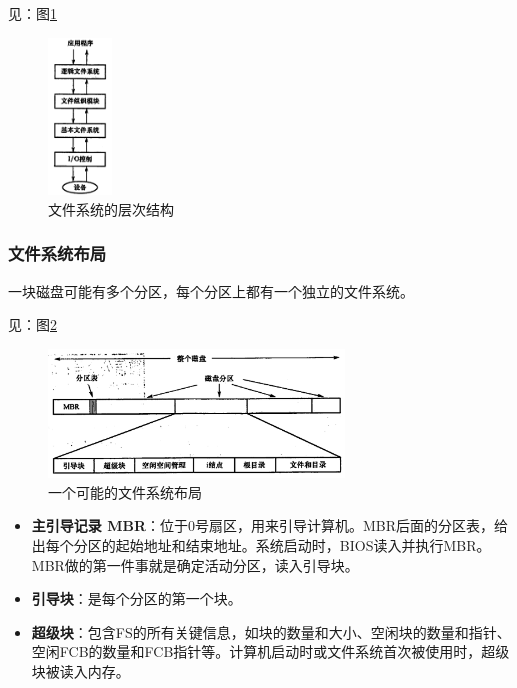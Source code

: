 \documentclass[12pt, a4paper, oneside]{ctexart}
\begin{document}
见：图\ref{fs-layer}

\begin{figure}[h]
  \centering
  \includegraphics[width=0.15\textwidth]{./images/fs-layer.png}
  \caption{文件系统的层次结构}
  \label{fs-layer}
\end{figure}

\subsubsection{文件系统布局}

一块磁盘可能有多个分区，每个分区上都有一个独立的文件系统。

见：图\ref{fs-layout}

\begin{figure}[h]
  \centering
  \includegraphics[width=0.7\textwidth]{./images/fs-layout.png}
  \caption{一个可能的文件系统布局}
  \label{fs-layout}
\end{figure}

\begin{itemize}
  \item {\bf 主引导记录 MBR}：位于0号扇区，用来引导计算机。MBR后面的分区表，给出每个分区的起始地址和结束地址。系统启动时，BIOS读入并执行MBR。MBR做的第一件事就是确定活动分区，读入引导块。
  \item {\bf 引导块}：是每个分区的第一个块。
  \item {\bf 超级块}：包含FS的所有关键信息，如块的数量和大小、空闲块的数量和指针、空闲FCB的数量和FCB指针等。计算机启动时或文件系统首次被使用时，超级块被读入内存。
\end{itemize}
\end{document}
